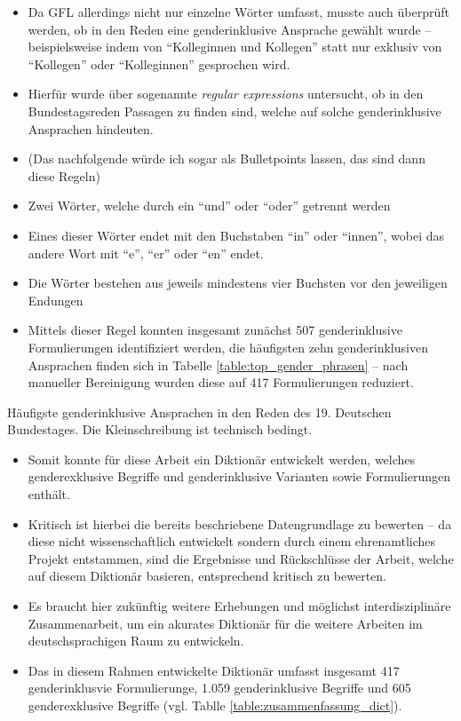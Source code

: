 \documentclass[12pt, 
    twoside=false, 
    bibliography=totoc, 
    numbers=endperiod, 
    headings=normal, 
    toc=chapterentrydotfill
    ]{scrbook}
\begin{document}
\begin{itemize}
    \item Da GFL allerdings nicht nur einzelne Wörter umfasst, musste auch überprüft werden, ob in den Reden eine genderinklusive Ansprache gewählt wurde -- beispielsweise indem von \enquote{Kolleginnen und Kollegen} statt nur exklusiv von \enquote{Kollegen} oder \enquote{Kolleginnen} gesprochen wird. 
    \item Hierfür wurde über sogenannte \emph{regular expressions} \parencite{thompson_1968} untersucht, ob in den Bundestagsreden Passagen zu finden sind, welche auf solche genderinklusive Ansprachen hindeuten.
    \item (Das nachfolgende würde ich sogar als Bulletpoints lassen, das sind dann diese Regeln)
    \item Zwei Wörter, welche durch ein \enquote{und} oder \enquote{oder} getrennt werden
    \item Eines dieser Wörter endet mit den Buchstaben \enquote{in} oder \enquote{innen}, wobei das andere Wort mit \enquote{e}, \enquote{er} oder \enquote{en} endet.
    \item Die Wörter bestehen aus jeweils mindestens vier Buchsten vor den jeweiligen Endungen
    \item Mittels dieser Regel konnten insgesamt zunächst 507 genderinklusive Formulierungen identifiziert werden, die häufigsten zehn genderinklusiven Ansprachen finden sich in Tabelle \ref{table:top_gender_phrasen}  -- nach manueller Bereinigung wurden diese auf 417 Formulierungen reduziert.
\end{itemize}

\begin{table}[htb]
    \centering
    \caption[Häufigste genderinklusive Ansprachen in den Reden des 19. Deutschen Bundestages]{Häufigste genderinklusive Ansprachen in den Reden des 19. Deutschen Bundestages. Die Kleinschreibung ist technisch bedingt.}
    
    \label{table:top_gender_phrasen}
\end{table}

\begin{itemize}
    \item Somit konnte für diese Arbeit ein Diktionär entwickelt werden, welches genderexklusive Begriffe und genderinklusive Varianten sowie Formulierungen enthält. 
    \item Kritisch ist hierbei die bereits beschriebene Datengrundlage zu bewerten -- da diese nicht wissenschaftlich entwickelt sondern durch einem ehrenamtliches Projekt entstammen, sind die Ergebnisse und Rückschlüsse der Arbeit, welche auf diesem Diktionär basieren, entsprechend kritisch zu bewerten. 
    \item Es braucht hier zukünftig weitere Erhebungen und möglichst interdisziplinäre Zusammenarbeit, um ein akurates Diktionär für die weitere Arbeiten im deutschsprachigen Raum zu entwickeln.
    \item Das in diesem Rahmen entwickelte Diktionär umfasst insgesamt 417 genderinklusvie Formulierunge, 1.059 genderinklusive Begriffe und 605 genderexklusive Begriffe (vgl. Tablle \ref{table:zusammenfassung_dict}).
\end{itemize}
\end{document}

